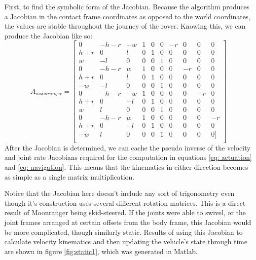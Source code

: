 \documentclass[12pt]{article}
\begin{document}
First, to find the symbolic form of the Jacobian. 
Because the algorithm produces a Jacobian in the contact frame coordinates as opposed to the world coordinates, the values are stable throughout the journey of the rover. 
Knowing this, we can produce the Jacobian like so:
\begin{equation}
    A_{moonranger} =
    \begin{bmatrix}
0 & - h - r& -w& 1& 0& 0& -r&  0&  0&  0\\
h + r& 0&  l& 0& 1& 0&  0&  0&  0&  0\\
w & -l& 0& 0& 0& 1&  0&  0&  0&  0\\
0& -h - r&  w& 1& 0& 0&  0& -r&  0&  0\\
h + r&0&  l& 0& 1& 0&  0&  0&  0&  0\\
-w&-l&0& 0& 0& 1&  0&  0&  0&  0\\
0& - h - r& -w& 1& 0& 0&  0&  0& -r&  0\\
h + r&0& -l& 0& 1& 0&  0&  0&  0&  0\\
w&l&0& 0& 0& 1&  0&  0&  0&  0\\
0& - h - r&  w& 1& 0& 0&  0&  0&  0& -r\\
h + r&0& -l& 0& 1& 0&  0&  0&  0&  0\\
-w&l&0& 0& 0& 1&  0&  0&  0&  0]\\
    \end{bmatrix}
\end{equation}
After the Jacobian is determined, we can cache the pseudo inverse of the velocity and joint rate Jacobians required for the computation in equations \ref{eq: actuation} and \ref{eq: navigation}. 
This means that the kinematics in either direction becomes as simple as a single matrix multiplication.

Notice that the Jacobian here doesn't include any sort of trigonometry even though it's construction uses several different rotation matrices. 
This is a direct result of Moonranger being skid-steered. If the joints were able to swivel, or the joint frames arranged at certain offsets from the body frame, this Jacobian would be more complicated, though similarly static. 
Results of using this Jacobian to calculate velocity kinematics and then updating the vehicle's state through time are shown in figure \ref{fig:static1}, which was generated in Matlab. 
\end{document}
